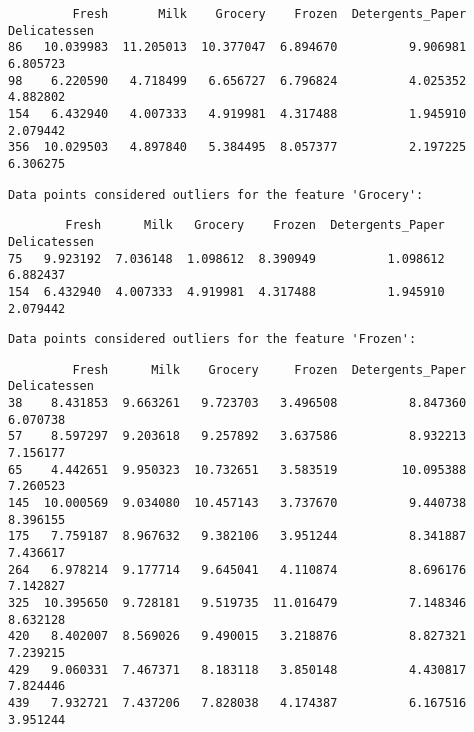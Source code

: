 \documentclass[11pt]{article}
\begin{document}
    
    \begin{verbatim}
         Fresh       Milk    Grocery    Frozen  Detergents_Paper  Delicatessen
86   10.039983  11.205013  10.377047  6.894670          9.906981      6.805723
98    6.220590   4.718499   6.656727  6.796824          4.025352      4.882802
154   6.432940   4.007333   4.919981  4.317488          1.945910      2.079442
356  10.029503   4.897840   5.384495  8.057377          2.197225      6.306275
    \end{verbatim}

    
    \begin{Verbatim}[commandchars=\\\{\}]
Data points considered outliers for the feature 'Grocery':

    \end{Verbatim}

    
    \begin{verbatim}
        Fresh      Milk   Grocery    Frozen  Detergents_Paper  Delicatessen
75   9.923192  7.036148  1.098612  8.390949          1.098612      6.882437
154  6.432940  4.007333  4.919981  4.317488          1.945910      2.079442
    \end{verbatim}

    
    \begin{Verbatim}[commandchars=\\\{\}]
Data points considered outliers for the feature 'Frozen':

    \end{Verbatim}

    
    \begin{verbatim}
         Fresh      Milk    Grocery     Frozen  Detergents_Paper  Delicatessen
38    8.431853  9.663261   9.723703   3.496508          8.847360      6.070738
57    8.597297  9.203618   9.257892   3.637586          8.932213      7.156177
65    4.442651  9.950323  10.732651   3.583519         10.095388      7.260523
145  10.000569  9.034080  10.457143   3.737670          9.440738      8.396155
175   7.759187  8.967632   9.382106   3.951244          8.341887      7.436617
264   6.978214  9.177714   9.645041   4.110874          8.696176      7.142827
325  10.395650  9.728181   9.519735  11.016479          7.148346      8.632128
420   8.402007  8.569026   9.490015   3.218876          8.827321      7.239215
429   9.060331  7.467371   8.183118   3.850148          4.430817      7.824446
439   7.932721  7.437206   7.828038   4.174387          6.167516      3.951244
    \end{verbatim}
\end{document}
